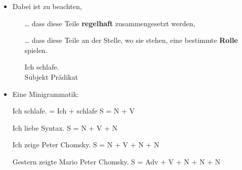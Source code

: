 \begin{frame}

\begin{itemize}
\item Dabei ist zu beachten, 

\begin{itemize}

	\item [\dots] dass diese Teile \textbf{regelhaft} zusammengesetzt werden,

	\eal 
	\zl

\pause

	\item [\dots] dass diese Teile an der Stelle, wo sie stehen, eine bestimmte \textbf{Rolle} spielen.
			
	\ea
	\gll Ich schlafe.\\
	Subjekt Prädikat\\
	\z
	
\end{itemize}

\end{itemize}

\end{frame}


\begin{frame}

\begin{itemize}
	\item Eine Minigrammatik:

	\eal 
	\ex Ich schlafe. = Ich + schlafe
\pause	
	\ex	S = N + V 
	\zl

\pause
	
	\eal 
	\ex Ich liebe Syntax.
\pause
	\ex S = N + V + N
	\zl

\pause
		
	\eal 
	\ex Ich zeige Peter Chomsky.
\pause
	\ex S = N + V + N + N 
	\zl
	
\pause
	
	\eal 
	\ex Gestern zeigte Mario Peter Chomsky.
\pause
	\ex S = Adv + V + N + N + N 
	\zl

\end{itemize}

\end{frame}


